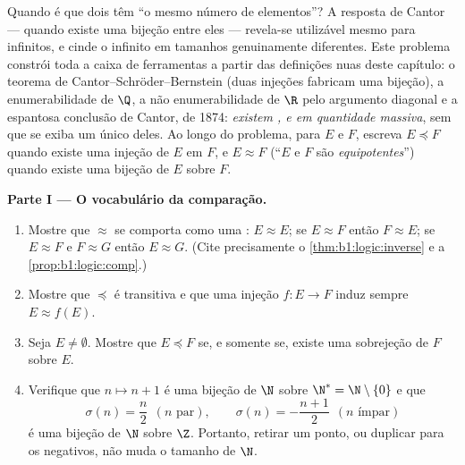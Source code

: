 \begin{problem}\label{pb:b1:logic:1}
Quando é que dois  têm ``o mesmo número de elementos''? A
resposta de Cantor --- quando existe uma bijeção entre eles --- revela-se
utilizável mesmo para  infinitos, e cinde o infinito em tamanhos
genuinamente diferentes. Este problema constrói toda a caixa de
ferramentas a partir das definições nuas deste capítulo: o teorema de
Cantor--Schröder--Bernstein (duas injeções fabricam uma bijeção), a
enumerabilidade de $\Q$, a não enumerabilidade de $\R$ pelo argumento
diagonal e a espantosa conclusão de Cantor, de 1874: \emph{existem
, e em quantidade massiva}, sem que se exiba um
único deles.
Ao longo do problema, para  $E$ e $F$, escreva $E \preceq F$ quando
existe uma injeção de $E$ em $F$, e $E \approx F$ (``$E$ e
$F$ são \emph{equipotentes}'') quando existe uma bijeção de $E$
sobre $F$.

\medskip
\noindent\textbf{Parte I --- O vocabulário da comparação.}
\begin{enumerate}
  \item Mostre que $\approx$ se comporta como uma :
        $E \approx E$; se $E \approx F$ então $F \approx E$; se
        $E \approx F$ e $F \approx G$ então $E \approx G$. (Cite
        precisamente o \cref{thm:b1:logic:inverse} e a
        \cref{prop:b1:logic:comp}.)
  \item Mostre que $\preceq$ é transitiva e que uma injeção
        $f \colon E \to F$ induz sempre $E \approx f(E)$.
  \item Seja $E \neq \emptyset$. Mostre que $E \preceq F$ se, e somente
        se, existe uma sobrejeção de $F$ sobre $E$.
  \item Verifique que $n \mapsto n + 1$ é uma bijeção de $\N$ sobre
        $\N^* = \N \setminus \{0\}$ e que
        \[
        \sigma(n) = \frac n2 \ \ (n \text{ par}), \qquad
        \sigma(n) = -\frac{n+1}2 \ \ (n \text{ ímpar})
        \]
        é uma bijeção de $\N$ sobre $\Z$. Portanto, retirar um ponto,
        ou duplicar para os negativos, não muda o tamanho de
        $\N$.
\end{enumerate}


\end{problem}
